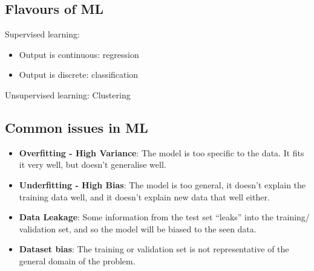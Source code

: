 \documentclass{article}
\begin{document}
\subsection{Flavours of ML}
Supervised learning:
\begin{itemize}
\item Output is continuous: regression
\item Output is discrete: classification
\end{itemize}

Unsupervised learning: Clustering
\subsection{Common issues in ML}
\begin{itemize}
\item \textbf{Overfitting - High Variance}: The model is too specific to the
  data. It fits it very well, but doesn't generalise well.
\item \textbf{Underfitting - High Bias}: The model is too general, it doesn't
  explain the training data well, and it doesn't explain new data that well either.
\item \textbf{Data Leakage}: Some information from the test set ``leaks'' into
  the training/ validation set, and so the model will be biased to the seen data.
\item \textbf{Dataset bias}: The training or validation set is not
  representative of the general domain of the problem. 
\end{itemize}
\end{document}
